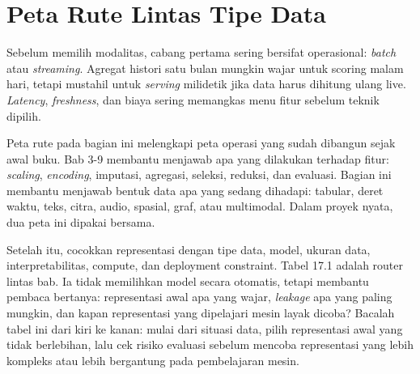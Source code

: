 \section{Peta Rute Lintas Tipe Data}\label{peta-rute-lintas-tipe-data}

Sebelum memilih modalitas, cabang pertama sering bersifat operasional: \emph{batch} atau \emph{streaming}. Agregat histori satu bulan mungkin wajar untuk scoring malam hari, tetapi mustahil untuk \emph{serving} milidetik jika data harus dihitung ulang live. \emph{Latency}, \emph{freshness}, dan biaya sering memangkas menu fitur sebelum teknik dipilih.

Peta rute pada bagian ini melengkapi peta operasi yang sudah dibangun sejak awal buku. Bab 3-9 membantu menjawab apa yang dilakukan terhadap fitur: \emph{scaling}, \emph{encoding}, imputasi, agregasi, seleksi, reduksi, dan evaluasi. Bagian ini membantu menjawab bentuk data apa yang sedang dihadapi: tabular, deret waktu, teks, citra, audio, spasial, graf, atau multimodal. Dalam proyek nyata, dua peta ini dipakai bersama.

Setelah itu, cocokkan representasi dengan tipe data, model, ukuran data, interpretabilitas, compute, dan deployment constraint. Tabel 17.1 adalah router lintas bab. Ia tidak memilihkan model secara otomatis, tetapi membantu pembaca bertanya: representasi awal apa yang wajar, \emph{leakage} apa yang paling mungkin, dan kapan representasi yang dipelajari mesin layak dicoba? Bacalah tabel ini dari kiri ke kanan: mulai dari situasi data, pilih representasi awal yang tidak berlebihan, lalu cek risiko evaluasi sebelum mencoba representasi yang lebih kompleks atau lebih bergantung pada pembelajaran mesin.


